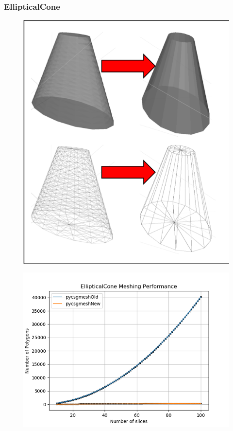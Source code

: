 \documentclass[12pt,a4paper]{article}
\begin{document}
\newpage
\subsubsection{EllipticalCone}

\begin{figure}[h!]
\centering
\begin{minipage}{.2\textwidth}
  \centering
  \includegraphics[height=1\linewidth]{Images//Meshes//ellipticalcone.png}
  \label{fig:test1}
\end{minipage}%
\begin{minipage}{.3\textwidth}
  \centering
  \includegraphics[scale=0.35]{Images//Quad_fits//Ellipticalcone_quad.png}
  \label{fig:test2}
\end{minipage}%
\end{figure}
\end{document}
